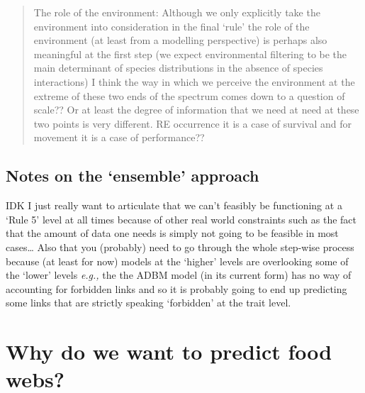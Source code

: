 \documentclass[
]{article}
\begin{document}
\begin{tcolorbox}
\begin{quote}
The role of the environment: Although we only explicitly take the
environment into consideration in the final `rule' the role of the
environment (at least from a modelling perspective) is perhaps also
meaningful at the first step (we expect environmental filtering to be
the main determinant of species distributions in the absence of species
interactions) I think the way in which we perceive the environment at
the extreme of these two ends of the spectrum comes down to a question
of scale?? Or at least the degree of information that we need at need at
these two points is very different. RE occurrence it is a case of
survival and for movement it is a case of performance??
\end{quote}

\subsection*{Notes on the `ensemble'
approach}\label{notes-on-the-ensemble-approach}

IDK I just really want to articulate that we can't feasibly be
functioning at a `Rule 5' level at all times because of other real world
constraints such as the fact that the amount of data one needs is simply
not going to be feasible in most cases\ldots{} Also that you (probably)
need to go through the whole step-wise process because (at least for
now) models at the `higher' levels are overlooking some of the `lower'
levels \emph{e.g.,} the the ADBM model (in its current form) has no way
of accounting for forbidden links and so it is probably going to end up
predicting some links that are strictly speaking `forbidden' at the
trait level.

\end{tcolorbox}

\section{Why do we want to predict food webs?}\label{sec-network-why}
\end{document}
